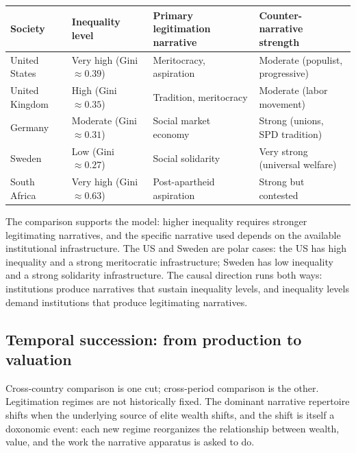 \begin{center}
\begin{tabular}{p{2.5cm}p{3cm}p{3.5cm}p{3cm}}
\toprule
Society & Inequality level & Primary legitimation narrative & Counter-narrative strength \\
\midrule
United States & Very high (Gini $\approx 0.39$) & Meritocracy, aspiration & Moderate (populist, progressive) \\[4pt]
United Kingdom & High (Gini $\approx 0.35$) & Tradition, meritocracy & Moderate (labor movement) \\[4pt]
Germany & Moderate (Gini $\approx 0.31$) & Social market economy & Strong (unions, SPD tradition) \\[4pt]
Sweden & Low (Gini $\approx 0.27$) & Social solidarity & Very strong (universal welfare) \\[4pt]
South Africa & Very high (Gini $\approx 0.63$) & Post-apartheid aspiration & Strong but contested \\
\bottomrule
\end{tabular}
\end{center}

The comparison supports the model: higher inequality requires stronger legitimating narratives, and the specific narrative used depends on the available institutional infrastructure.
The US and Sweden are polar cases: the US has high inequality and a strong meritocratic infrastructure; Sweden has low inequality and a strong solidarity infrastructure.
The causal direction runs both ways: institutions produce narratives that sustain inequality levels, and inequality levels demand institutions that produce legitimating narratives.

\subsection{Temporal succession: from production to valuation}
\label{sec:ch24-temporal-succession}

Cross-country comparison is one cut; cross-period comparison is the other.
Legitimation regimes are not historically fixed. The dominant narrative repertoire shifts when the underlying source of elite wealth shifts, and the shift is itself a doxonomic event: each new regime reorganizes the relationship between wealth, value, and the work the narrative apparatus is asked to do.

